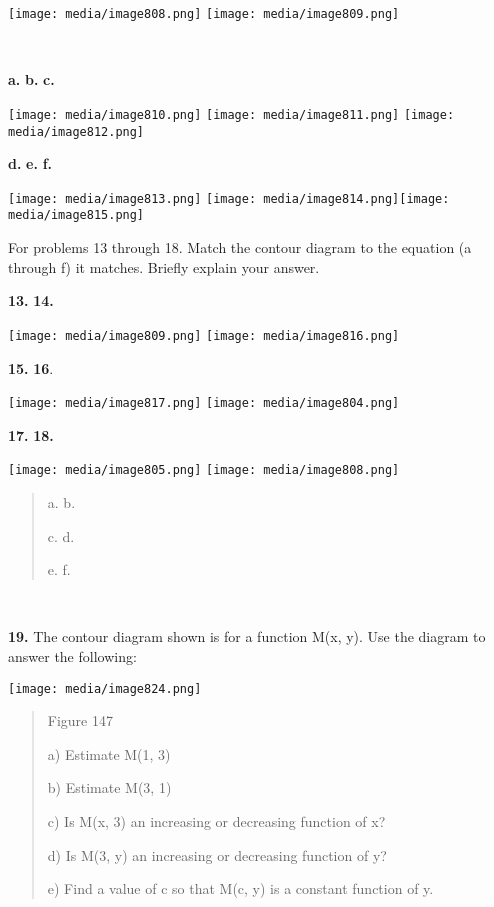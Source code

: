 \texttt{[image: media/image808.png]}
\texttt{[image: media/image809.png]}

\textbf{\\
}

\textbf{a.} \textbf{b.} \textbf{c.}

\texttt{[image: media/image810.png]}
\texttt{[image: media/image811.png]}
\texttt{[image: media/image812.png]}

\textbf{d.} \textbf{e.} \textbf{f.}

\texttt{[image: media/image813.png]}
\texttt{[image: media/image814.png]}\texttt{[image: media/image815.png]}

For problems 13 through 18. Match the contour diagram to the equation (a
through f) it matches. Briefly explain your answer.

\textbf{13.} \textbf{14.}

\texttt{[image: media/image809.png]}
\texttt{[image: media/image816.png]}

\textbf{15.} \textbf{16}.

\texttt{[image: media/image817.png]}
\texttt{[image: media/image804.png]}

\textbf{17.} \textbf{18.}

\texttt{[image: media/image805.png]}
\texttt{[image: media/image808.png]}

\begin{quote}
a. b.

c. d.

e. f.
\end{quote}

\textbf{\\
}

\textbf{19.} The contour diagram shown is for a function M(x, y). Use
the diagram to answer the following:

\texttt{[image: media/image824.png]}

\begin{quote}
Figure 147

a) Estimate M(1, 3)

b) Estimate M(3, 1)

c) Is M(x, 3) an increasing or decreasing function of x?

d) Is M(3, y) an increasing or decreasing function of y?

e) Find a value of c so that M(c, y) is a constant function of y.
\end{quote}

